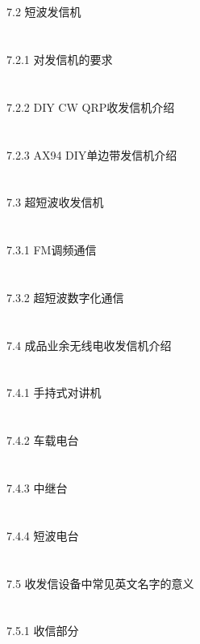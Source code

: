 \documentclass[12pt,UTF8]{ctexbook}
\begin{document}
\section{}7.2 短波发信机
\section{}7.2.1 对发信机的要求
\section{}7.2.2 DIY CW QRP收发信机介绍
\section{}7.2.3 AX94 DIY单边带发信机介绍
\section{}7.3 超短波收发信机
\section{}7.3.1 FM调频通信
\section{}7.3.2 超短波数字化通信
\section{}7.4 成品业余无线电收发信机介绍
\section{}7.4.1 手持式对讲机
\section{}7.4.2 车载电台
\section{}7.4.3 中继台
\section{}7.4.4 短波电台
\section{}7.5 收发信设备中常见英文名字的意义
\section{}7.5.1 收信部分
\end{document}
